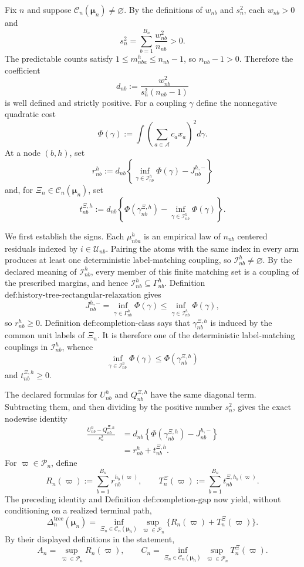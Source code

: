 Fix \(n\) and suppose \(\mathcal C_n(\boldsymbol\mu_n)\ne\varnothing\).  By the definitions of \(w_{nb}\) and \(s_n^2\), each \(w_{nb}>0\) and
\[
s_n^2=\sum_{b=1}^{B_n}\frac{w_{nb}^2}{n_{nb}}>0.
\]
The predictable counts satisfy \(1\le m_{nba}^{h}\le n_{nb}-1\), so \(n_{nb}-1>0\).  Therefore the coefficient
\[
d_{nb}:=\frac{w_{nb}^2}{s_n^2(n_{nb}-1)}
\]
is well defined and strictly positive.  For a coupling \(\gamma\) define the nonnegative quadratic cost
\[
\Phi(\gamma):=\int\left(\sum_{a\in\mathcal A}c_ax_a\right)^2d\gamma.
\]
At a node \((b,h)\), set
\[
 r_{nb}^{h}:=d_{nb}\left\{\inf_{\gamma\in\mathcal I_{nb}^{h}}\Phi(\gamma)-J_{nb}^{h,-}\right\}
\]
and, for \(\Xi_n\in\mathcal C_n(\boldsymbol\mu_n)\), set
\[
 t_{nb}^{\Xi,h}:=d_{nb}\left\{\Phi(\gamma_{nb}^{\Xi,h})-\inf_{\gamma\in\mathcal I_{nb}^{h}}\Phi(\gamma)\right\}.
\]

We first establish the signs.  Each \(\mu_{nba}^{h}\) is an empirical law of \(n_{nb}\) centered residuals indexed by \(i\in\mathcal U_{nb}\).  Pairing the atoms with the same index in every arm produces at least one deterministic label-matching coupling, so \(\mathcal I_{nb}^{h}\ne\varnothing\).  By the declared meaning of \(\mathcal I_{nb}^{h}\), every member of this finite matching set is a coupling of the prescribed margins, and hence
\(\mathcal I_{nb}^{h}\subseteq\Gamma_{nb}^{h}\).  Definition \(\text{def:history-tree-rectangular-relaxation}\) gives
\[
J_{nb}^{h,-}=\inf_{\gamma\in\Gamma_{nb}^{h}}\Phi(\gamma)
\le \inf_{\gamma\in\mathcal I_{nb}^{h}}\Phi(\gamma),
\]
so \(r_{nb}^{h}\ge0\).  Definition \(\text{def:completion-class}\) says that \(\gamma_{nb}^{\Xi,h}\) is induced by the common unit labels of \(\Xi_n\).  It is therefore one of the deterministic label-matching couplings in \(\mathcal I_{nb}^{h}\), whence
\[
\inf_{\gamma\in\mathcal I_{nb}^{h}}\Phi(\gamma)
\le \Phi(\gamma_{nb}^{\Xi,h})
\]
and \(t_{nb}^{\Xi,h}\ge0\).

The declared formulas for \(U_{nb}^{h}\) and \(Q_{nb}^{\Xi,h}\) have the same diagonal term.  Subtracting them, and then dividing by the positive number \(s_n^2\), gives the exact nodewise identity
\[
\begin{aligned}
\frac{U_{nb}^{h}-Q_{nb}^{\Xi,h}}{s_n^2}
&=d_{nb}\left\{\Phi(\gamma_{nb}^{\Xi,h})-J_{nb}^{h,-}\right\}\\
&=r_{nb}^{h}+t_{nb}^{\Xi,h}.
\end{aligned}
\]
For \(\varpi\in\mathcal P_n\), define
\[
R_n(\varpi):=\sum_{b=1}^{B_n}r_{nb}^{h_b(\varpi)},
\qquad
T_n^{\Xi}(\varpi):=\sum_{b=1}^{B_n}t_{nb}^{\Xi,h_b(\varpi)}.
\]
The preceding identity and Definition \(\text{def:completion-gap}\) now yield, without conditioning on a realized terminal path,
\[
\Delta_n^{\mathrm{tree}}(\boldsymbol\mu_n)
=\inf_{\Xi_n\in\mathcal C_n(\boldsymbol\mu_n)}
 \sup_{\varpi\in\mathcal P_n}
 \{R_n(\varpi)+T_n^{\Xi}(\varpi)\}.
\]
By their displayed definitions in the statement,
\[
A_n=\sup_{\varpi\in\mathcal P_n}R_n(\varpi),
\qquad
C_n=\inf_{\Xi_n\in\mathcal C_n(\boldsymbol\mu_n)}
     \sup_{\varpi\in\mathcal P_n}T_n^{\Xi}(\varpi).
\]

